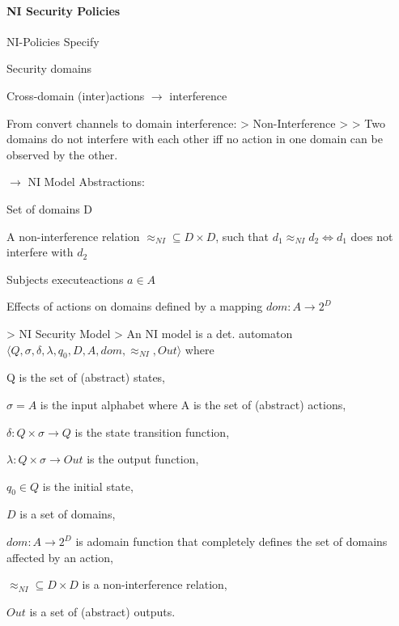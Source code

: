 \documentclass[a4paper]{article}
\begin{document}
\begin{multicols}{3}
    \paragraph{NI Security Policies}
    NI-Policies Specify
    \begin{itemize*}
        \item Security domains
        \item Cross-domain (inter)actions $\rightarrow$ interference
    \end{itemize*}
    From convert channels to domain interference:
    > Non-Interference
    >
    > Two domains do not interfere with each other iff no action in one domain can be observed by the other.

    $\rightarrow$ NI Model Abstractions:
    \begin{itemize*}
        \item Set of domains D
        \item A non-interference relation $\approx_{NI}\subseteq D\times D$, such that $d_1 \approx_{NI} d_2\Leftrightarrow d_1$ does not interfere with $d_2$
        \item Subjects executeactions $a\in A$
        \item Effects of actions on domains defined by a mapping $dom:A\rightarrow 2^D$
    \end{itemize*}

    > NI Security Model
    > An NI model is a det. automaton $⟨Q,\sigma,\delta,\lambda,q_0,D,A,dom,\approx_{NI},Out⟩$ where
    \begin{itemize*}
        \item Q is the set of (abstract) states,
        \item $\sigma=A$ is the input alphabet where A is the set of (abstract) actions,
        \item $\delta:Q\times\sigma\rightarrow Q$ is the state transition function,
        \item $\lambda:Q\times\sigma\rightarrow Out$ is the output function,
        \item $q_0\in Q$ is the initial state,
        \item $D$ is a set of domains,
        \item $dom:A\rightarrow 2^D$ is adomain function that completely defines the set of domains affected by an action,
        \item $\approx_{NI}\subseteq D\times D$ is a non-interference relation,
        \item $Out$ is a set of (abstract) outputs.
    \end{itemize*}


\end{multicols}
\end{document}
